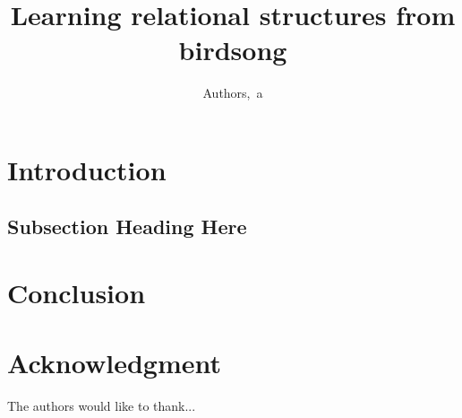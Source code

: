 \documentclass{article}
\begin{document}
\title{Learning relational structures from birdsong}
\author{Authors,~a}

\maketitle


\begin{abstract}
\blindtext[1]
\end{abstract}


\section{Introduction}
\blindtext

\subsection{Subsection Heading Here}
\blindtext


\section{Conclusion}
\blindtext

\section*{Acknowledgment}


The authors would like to thank...


\begin{thebibliography}{1}

\end{thebibliography}
\end{document}
